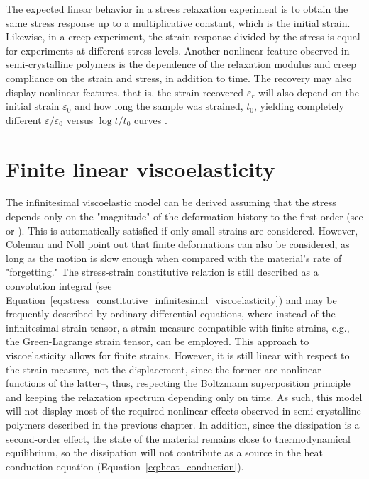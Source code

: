 The expected linear behavior in a stress relaxation experiment is to obtain the same stress response up to a multiplicative constant, which is the initial strain.
Likewise, in a creep experiment, the strain response divided by the stress is equal for experiments at different stress levels.
Another nonlinear feature observed in semi-crystalline polymers is the dependence of the relaxation modulus and creep compliance on the strain and stress, in addition to time.
The recovery may also display nonlinear features, that is, the strain recovered $\varepsilon_r$ will also depend on the initial strain $\varepsilon_0$ and how long the sample was strained, $t_0$, yielding completely different $\varepsilon/\varepsilon_0$ versus $\log t/t_0$ curves \citep{ferryViscoelasticPropertiesPolymers1980}.


\section{Finite linear viscoelasticity}
The infinitesimal viscoelastic model can be derived assuming that the stress depends only on the "magnitude" of the deformation history to the first order (see \cite{colemanFoundationsLinearViscoelasticity1961} or \cite{christensen2013theory}).
This is automatically satisfied if only small strains are considered.
However, Coleman and Noll \citep{colemanFoundationsLinearViscoelasticity1961} point out that finite deformations can also be considered, as long as the motion is slow enough when compared with the material's rate of "forgetting."
The stress-strain constitutive relation is still described as a convolution integral (see Equation~\eqref{eq:stress_constitutive_infinitesimal_viscoelasticity}) and may be frequently described by ordinary differential equations, where instead of the infinitesimal strain tensor, a strain measure compatible with finite strains, e.g., the Green-Lagrange strain tensor, can be employed.
This approach to viscoelasticity allows for finite strains.
However, it is still linear with respect to the strain measure,--not the displacement, since the former are nonlinear functions of the latter--, thus, respecting the Boltzmann superposition principle and keeping the relaxation spectrum depending only on time.
As such, this model will not display most of the required nonlinear effects observed in semi-crystalline polymers described in the previous chapter.
In addition, since the dissipation is a second-order effect, the state of the material remains close to thermodynamical equilibrium, so the dissipation will not contribute as a source in the heat conduction equation (Equation~\eqref{eq:heat_conduction}).

